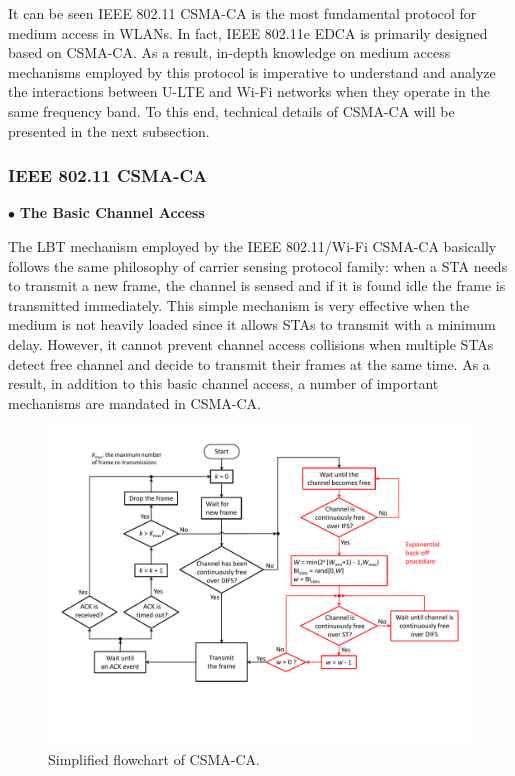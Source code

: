\documentclass[journal,draftclsnofoot,12pt,onecolumn]{IEEEtran}
\begin{document}
It can be seen IEEE 802.11 CSMA-CA is the most fundamental protocol for medium access in WLANs. In fact, IEEE 802.11e EDCA is primarily designed based on CSMA-CA. As a result, in-depth knowledge on medium access mechanisms employed by this protocol is imperative to understand and analyze the interactions between U-LTE and Wi-Fi networks when they operate in the same frequency band. To this end, technical details of CSMA-CA will be presented in the next subsection.

\subsubsection{IEEE 802.11 CSMA-CA}
\label{subsubsection:IEEE 802.11 CSMA-CA}

\vspace{3mm}
\noindent $\bullet$ \textbf{The Basic Channel Access}
\vspace{3mm}

\noindent The LBT mechanism employed by the IEEE 802.11/Wi-Fi CSMA-CA basically follows the same philosophy of carrier sensing protocol family: when a STA needs to transmit a new frame, the channel is sensed and if it is found idle the frame is transmitted immediately. This simple mechanism is very effective when the medium is not heavily loaded since it allows STAs to transmit with a minimum delay. However, it cannot prevent channel access collisions when multiple STAs detect free channel and decide to transmit their frames at the same time. As a result, in addition to this basic channel access, a number of important mechanisms are mandated in CSMA-CA.

\begin{figure}[!t]
\centering
\includegraphics[width=1.0\columnwidth]{figures2/CSMA-CA-flowchart}
\caption{Simplified flowchart of CSMA-CA.}
\label{figs:CSMA-CA-flowchart}
\end{figure}
\end{document}
